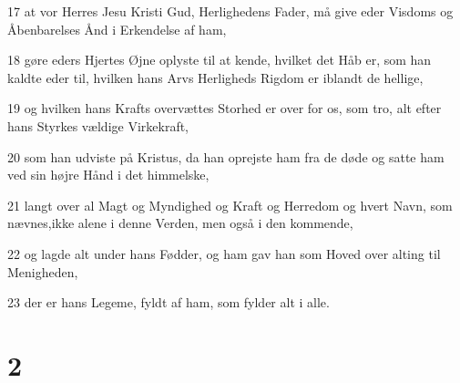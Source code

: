 \par 17 at vor Herres Jesu Kristi Gud, Herlighedens Fader, må give eder Visdoms og Åbenbarelses Ånd i Erkendelse af ham,
\par 18 gøre eders Hjertes Øjne oplyste til at kende, hvilket det Håb er, som han kaldte eder til, hvilken hans Arvs Herligheds Rigdom er iblandt de hellige,
\par 19 og hvilken hans Krafts overvættes Storhed er over for os, som tro, alt efter hans Styrkes vældige Virkekraft,
\par 20 som han udviste på Kristus, da han oprejste ham fra de døde og satte ham ved sin højre Hånd i det himmelske,
\par 21 langt over al Magt og Myndighed og Kraft og Herredom og hvert Navn, som nævnes,ikke alene i denne Verden, men også i den kommende,
\par 22 og lagde alt under hans Fødder, og ham gav han som Hoved over alting til Menigheden,
\par 23 der er hans Legeme, fyldt af ham, som fylder alt i alle.

\chapter{2}


